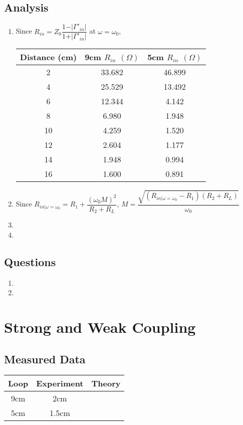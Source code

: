 \documentclass{article}
\begin{document}
\subsection{Analysis}

\begin{enumerate}
	\item Since $R_{in} = Z_0\dfrac{1 - \vert\Gamma '_{in}\vert}{1 + \vert\Gamma'_{in}\vert}$ at $\omega=\omega_0$,
	\begin{table}[H]
	\centering
		\begin{tabular}{|c|c|c|}
		\hline
		Distance (cm) & 9cm $R_{in}$ $(\Omega)$ & 5cm $R_{in}$ $(\Omega)$ \\ \hline
		2  & 33.682 & 46.899 \\ \hline
		4  & 25.529 & 13.492 \\ \hline
		6  & 12.344 & 4.142 \\ \hline
		8  & 6.980 & 1.948 \\ \hline
		10 & 4.259 & 1.520 \\ \hline
		12 & 2.604 & 1.177 \\ \hline
		14 & 1.948 & 0.994 \\ \hline
		16 & 1.600 & 0.891 \\ \hline
		\end{tabular}
	\end{table}
	\item Since $R_{in\vert\omega=\omega_0} = R_1 + \dfrac{(\omega_0M)^2}{R_2 + R_L}$, $M = \dfrac{\sqrt{(R_{in\vert\omega=\omega_0} - R_1)(R_2 + R_L)}}{\omega_0}$
	\item
	\item
\end{enumerate}

\subsection{Questions}

\begin{enumerate}
	\item
	\item
\end{enumerate}


\section{Strong and Weak Coupling}

\subsection{Measured Data}
\begin{table}[H]
\centering
\begin{tabular}{|c|c|c|}
\hline
Loop & Experiment & Theory \\ \hline
9cm & 2cm & \\ \hline
5cm & 1.5cm & \\ \hline
\end{tabular}
\end{table}
\end{document}
